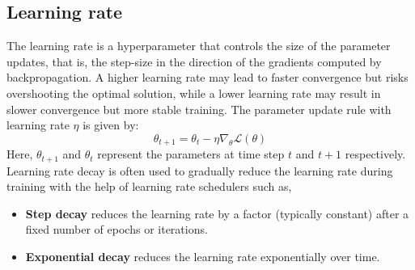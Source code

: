 \subsection{Learning rate}
The learning rate is a hyperparameter that controls the size of the parameter updates, that is, the step-size in the direction of the gradients computed by backpropagation. A higher learning rate may lead to faster convergence but risks overshooting the optimal solution, while a lower learning rate may result in slower convergence but more stable training. The parameter update rule with learning rate $\eta$ is given by:
\begin{equation}
    \theta_{t+1}=\theta_t-\eta \nabla_\theta \mathcal{L}(\theta)
    \end{equation}
Here, $\theta_{t+1}$ and $\theta_t$ represent the parameters at time step $t$ and $t+1$ respectively. Learning rate decay is often used to gradually reduce the learning rate during training with the help of learning rate schedulers such as,
\begin{itemize}
\item \textbf{Step decay} reduces the learning rate by a factor (typically constant) after a fixed number of epochs or iterations.
\item \textbf{Exponential decay} reduces the learning rate exponentially over time.
\end{itemize}
